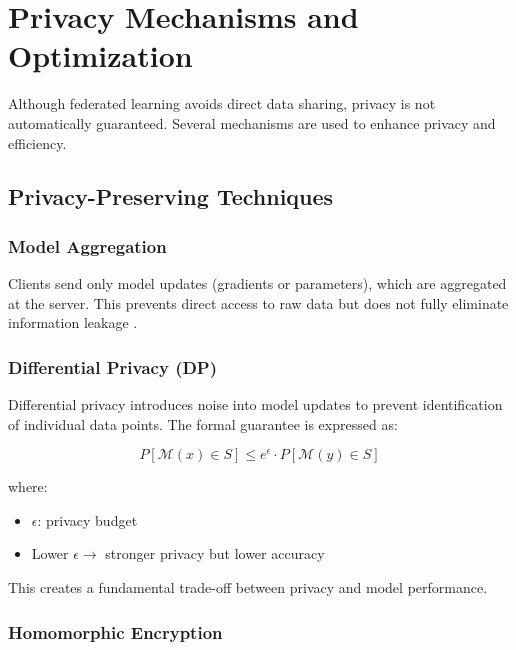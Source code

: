 
\chapter{Privacy Mechanisms and Optimization}
\label{ch:chapter3}

Although federated learning avoids direct data sharing, privacy is not automatically guaranteed. Several mechanisms are used to enhance privacy and efficiency.

\section{Privacy-Preserving Techniques}

\subsection{Model Aggregation}

Clients send only model updates (gradients or parameters), which are aggregated at the server. This prevents direct access to raw data but does not fully eliminate information leakage \cite{zhu2019deep}.

\subsection{Differential Privacy (DP)}

Differential privacy introduces noise into model updates to prevent identification of individual data points. The formal guarantee is expressed as:

\begin{equation}
    P[\mathcal{M}(x) \in S] \leq e^{\epsilon} \cdot P[\mathcal{M}(y) \in S]
\end{equation}

where:
\begin{itemize}
    \item $\epsilon$: privacy budget
    \item Lower $\epsilon \rightarrow$ stronger privacy but lower accuracy
\end{itemize}

This creates a fundamental trade-off between privacy and model performance.

\subsection{Homomorphic Encryption}

